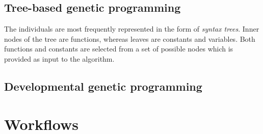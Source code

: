 \subsection{Tree-based genetic programming}
The individuals are most frequently represented in the form of \textit{syntax trees}. Inner nodes of the tree are functions, whereas leaves are constants and variables. Both functions and constants are selected from a set of possible nodes which is provided as input to the algorithm.


\subsection{Developmental genetic programming}

\section{Workflows}